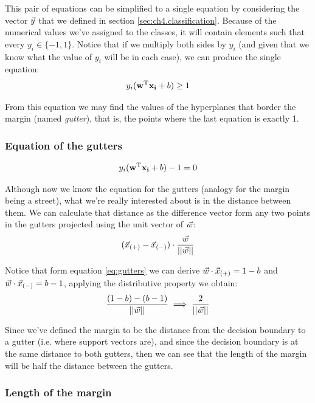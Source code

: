 This pair of equations can be simplified to a single equation by considering the vector $\vec{y}$ that we defined in section \ref{sec:ch4.classification}. Because of the numerical values we've assigned to the classes, it will contain elements such that every $y_i \in \{-1, 1\}$. Notice that if we multiply both sides by $y_i$ (and given that we know what the value of $y_i$ will be in each case), we can produce the single equation:
\begin{align}\label{eq:svmconstrain}
    y_i (\mathbf{w}^{\text{T}} \mathbf{x_i} + b) \ge 1
\end{align}

From this equation we may find the values of the hyperplanes that border the margin (named \emph{gutter}), that is, the points where the last equation is exactly 1. 

\subsubsection*{Equation of the gutters}
\begin{align}\label{eq:gutters}
    y_i (\mathbf{w}^{\text{T}} \mathbf{x_i} + b) -1 = 0
\end{align}

Although now we know the equation for the gutters (analogy for the margin being a street), what we're really interested about is in the distance between them. We can calculate that distance as the diff\-erence vector form any two points in the gutters projected using the unit vector of $\vec{w}$:
\begin{align*}
    (\vec{x}_{(+)} - \vec{x}_{(-)}) \cdot \frac{\vec{w}}{||\vec{w}||}
\end{align*}

Notice that form equation \ref{eq:gutters} we can derive $\vec{w} \cdot \vec{x}_{(+)} = 1 - b$ and $\vec{w} \cdot \vec{x}_{(-)} = b - 1$, applying the distributive property we obtain:
\begin{align*}
    \frac{(1 - b) - (b - 1)}{||\vec{w}||} \implies \frac{2}{||\vec{w}||}
\end{align*}

Since we've defined the margin to be the distance from the decision boundary to a gutter (i.e. where support vectors are), and since the decision boundary is at the same distance to both gutters, then we can see that the length of the margin will be half the distance between the gutters.

\subsubsection*{Length of the margin}

